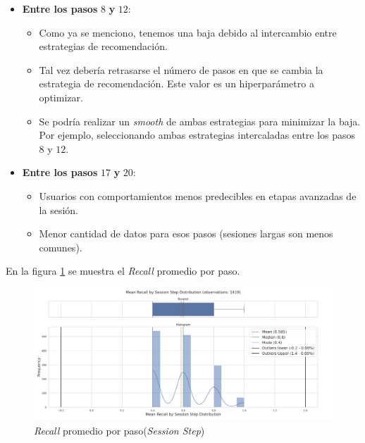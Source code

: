 \documentclass[11pt,a4paper,twoside]{thesis}
\begin{document}
\begin{itemize}
	\item \textbf{Entre los pasos} $8$ \textbf{y} $12$:
	      \begin{itemize}
		      \item Como ya se menciono, tenemos una baja debido al intercambio entre estrategias de recomendación.
		      \item Tal vez debería retrasarse el número de pasos en que se cambia la estrategia de recomendación. Este valor es un hiperparámetro a optimizar.
		      \item Se podría realizar un \textit{smooth} de ambas estrategias para minimizar la baja. Por ejemplo, seleccionando ambas estrategias intercaladas entre los pasos $8$ y $12$.
	      \end{itemize}
	\item \textbf{Entre los pasos} $17$ \textbf{y} $20$:
	      \begin{itemize}
		      \item Usuarios con comportamientos menos predecibles en etapas avanzadas de la sesión.
		      \item Menor cantidad de datos para esos pasos (sesiones largas son menos comunes).
	      \end{itemize}
\end{itemize}

\clearpage

En la figura \ref{fig:llama2-mean_recall_by_session_step_distribution} se muestra el \textit{Recall} promedio por paso.

\begin{figure}[htbp]
	\centering
	\includegraphics[width=15cm]{./images/llama2/mean_recall_by_session_step_distribution.png}
	\caption{\textit{Recall} promedio por paso(\textit{Session Step})}
	\label{fig:llama2-mean_recall_by_session_step_distribution}
\end{figure}
\end{document}
